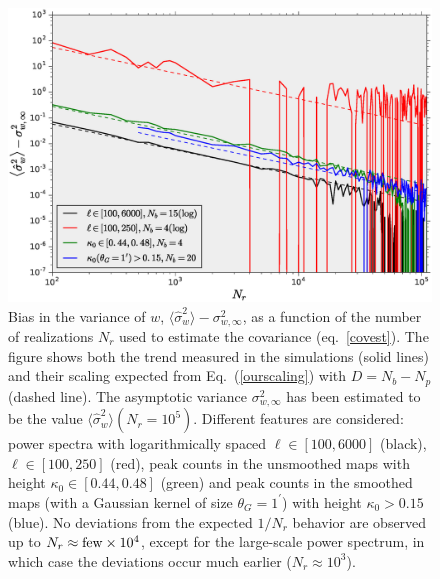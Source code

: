 \documentclass[reprint,aps,prd,superscriptaddress,showkeys,showpacs]{revtex4-1}
\newcommand{\h}[1]{\hat{#1}}
\begin{document}
\begin{figure}
\includegraphics[scale=0.3]{Figures/scaling_nr.eps}
\caption{Bias in the variance of $w$,
  $\langle\h{\sigma}^2_w\rangle-\sigma^2_{w,\infty}$, as a function of
  the number of realizations $N_r$ used to estimate the covariance
  (eq.~\ref{covest}). The figure shows both the trend measured in the
  simulations (solid lines) and their scaling expected from
  Eq.~(\ref{ourscaling}) with $D=N_b-N_p$ (dashed line). The
  asymptotic variance $\sigma^2_{w,\infty}$ has been estimated to be the value $\langle\h{\sigma}^2_w\rangle(N_r=10^5)$. Different features are considered: power spectra with logarithmically spaced $\ell\in[100,6000]$ (black), $\ell\in[100,250]$ (red), peak counts in the unsmoothed maps with height $\kappa_0\in[0.44,0.48]$ (green) and peak counts in the smoothed maps (with a Gaussian kernel of size $\theta_G=1^\prime$) with height $\kappa_0>0.15$ (blue). No deviations from the expected $1/N_r$ behavior are observed up to $N_r\approx{\rm few}\times10^4$, except for the large-scale power spectrum, in which case the deviations occur much earlier ($N_r\approx 10^3$).}
\label{wvar_nr}
\end{figure}
\end{document}
